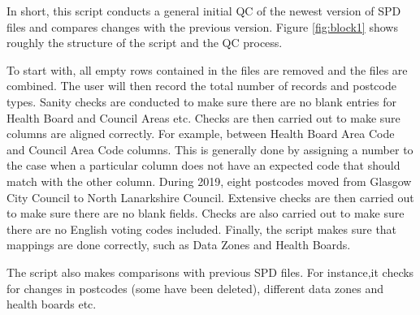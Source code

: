 \documentclass[12pt]{article} %
\begin{document}
In short, this script conducts a general initial
QC of the newest version of SPD files and compares
changes with the previous version. Figure \ref{fig:block1}
shows roughly the structure of the script and the QC process.

To start with, all empty rows contained in the files
are removed and the files are combined. The user will then
record the total number of records and postcode types.
Sanity checks are conducted to make sure there are
no blank entries for Health Board and Council Areas etc.
Checks are then carried out to make sure columns are
aligned correctly. For example, between Health Board Area
Code and Council Area Code columns. This is generally done
by assigning a number to the case when a particular
column does not have an expected code that should match
with the other column. 
During 2019, eight postcodes moved from Glasgow City Council to
North Lanarkshire Council. Extensive checks are then carried
out to make sure there are no blank fields. Checks are also
carried out to make sure there are no English voting codes included.
Finally, the script makes sure that mappings are done correctly,
such as Data Zones and Health Boards.

The script also makes comparisons with previous SPD files.
For instance,it checks for changes in postcodes
(some have been deleted), different data zones and
health boards etc.
\end{document}
